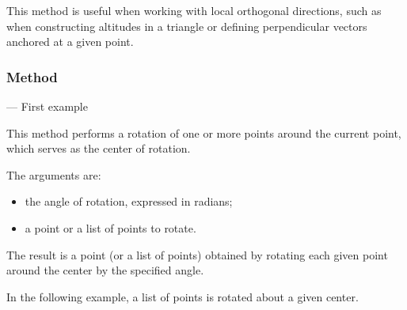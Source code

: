 \medskip
\noindent
This method is useful when working with local orthogonal directions, such as when constructing altitudes in a triangle or defining perpendicular vectors anchored at a given point.

\vspace{1em}


\begin{tkzexample}[latex=7cm]
 \begin{center}
 \end{center}
\end{tkzexample}

\subsubsection{Method } — First example
\label{ssub:example_rotation_of_points}

This method performs a rotation of one or more points around the current point, which serves as the center of rotation.

\medskip
\noindent
The arguments are:
\begin{itemize}
  \item the angle of rotation, expressed in radians;
  \item a point or a list of points to rotate.
\end{itemize}

\noindent
The result is a point (or a list of points) obtained by rotating each given point around the center by the specified angle.

\medskip
\noindent
In the following example, a list of points is rotated about a given center.

\vspace{1em}

\begin{tkzexample}[latex=7cm]
\begin{center}
\end{center}
\end{tkzexample}

